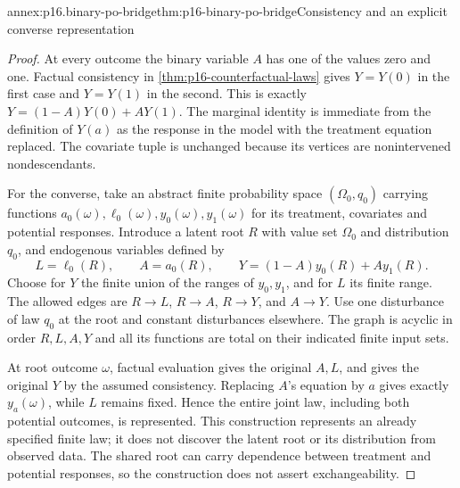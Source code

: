 \begin{annexitem}{annex:p16.binary-po-bridge}{thm:p16-binary-po-bridge}{Consistency and an explicit converse representation}
\begin{proof}
At every outcome the binary variable \(A\) has one of the values
zero and one. Factual consistency in
\cref{thm:p16-counterfactual-laws} gives \(Y=Y(0)\) in the
first case and \(Y=Y(1)\) in the second. This is exactly
\(Y=(1-A)Y(0)+AY(1)\). The marginal identity is immediate from
the definition of \(Y(a)\) as the response in the model with the
treatment equation replaced. The covariate tuple is unchanged because
its vertices are nonintervened nondescendants.

For the converse, take an abstract finite probability space
\((\Omega_0,q_0)\) carrying functions
\(a_0(\omega),\ell_0(\omega),y_0(\omega),y_1(\omega)\)
for its treatment, covariates and potential responses. Introduce a
latent root \(R\) with value set \(\Omega_0\) and distribution
\(q_0\), and endogenous variables defined by
\[
 L=\ell_0(R),\qquad A=a_0(R),\qquad
 Y=(1-A)y_0(R)+Ay_1(R).
\]
Choose for \(Y\) the finite union of the ranges of \(y_0,y_1\),
and for \(L\) its finite range. The allowed edges are
\(R\to L\), \(R\to A\), \(R\to Y\), and \(A\to Y\).
Use one disturbance of law \(q_0\) at the root and constant
disturbances elsewhere. The graph is acyclic in order \(R,L,A,Y\)
and all its functions are total on their indicated finite input sets.

At root outcome \(\omega\), factual evaluation gives the original
\(A,L\), and gives the original \(Y\) by the assumed consistency.
Replacing \(A\)'s equation by \(a\) gives exactly \(y_a(\omega)\),
while \(L\) remains fixed. Hence the entire joint law, including
both potential outcomes, is represented. This construction represents
an already specified finite law; it does not discover the latent root
or its distribution from observed data. The shared root can carry
dependence between treatment and potential responses, so the construction
does not assert exchangeability.
\end{proof}
\end{annexitem}

